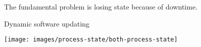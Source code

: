 \begin{frame}{}%
\begin{block}{}
\begin{center}
{\LARGE
The fundamental problem is losing state because of downtime.
}
\vspace{0.5ex}
\end{center}
\end{block}
\end{frame}

\begin{frame}{Dynamic software updating}%
\vspace*{-3mm}%
\begin{center}%
\texttt{[image: images/process-state/both-process-state]}%
\end{center}%
\end{frame}




